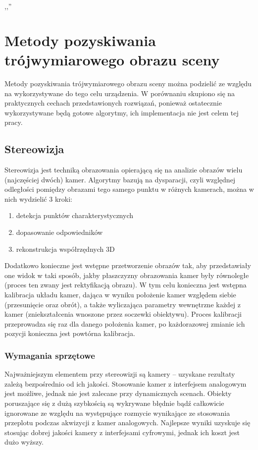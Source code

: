 

\begin{savequote}[70mm]
,,''
\qauthor{}
\end{savequote}

\chapter{Metody pozyskiwania trójwymiarowego obrazu sceny}
\label{chap:porownanie}

Metody pozyskiwania trójwymiarowego obrazu sceny można podzielić ze względu
na wykorzystywane do tego celu urządzenia. W porównaniu skupiono się na praktycznych
cechach przedstawionych rozwiązań, ponieważ ostatecznie wykorzystywane będą gotowe
algorytmy, ich implementacja nie jest celem tej pracy.


\section{Stereowizja}

Stereowizja jest techniką obrazowania opierającą się na analizie obrazów wielu
(najczęściej dwóch) kamer. Algorytmy bazują na dysparacji, czyli względnej odległości pomiędzy
obrazami tego samego punktu w różnych kamerach, można w nich wydzielić 3 kroki:

\begin{enumerate}
\item detekcja punktów charakterystycznych
\item dopasowanie odpowiedników
\item rekonstrukcja współrzędnych 3D
\end{enumerate}

Dodatkowo konieczne jest wstępne przetworzenie obrazów tak, aby przedstawiały
one widok w taki sposób, jakby płaszczyzny obrazowania kamer były równoległe
(proces ten zwany jest rektyfikacją obrazu). W tym celu konieczna jest wstępna
kalibracja układu kamer, dająca w wyniku położenie kamer względem siebie (przesunięcie
oraz obrót), a także wyliczająca parametry wewnętrzne każdej z kamer (zniekształcenia
wnoszone przez soczewki obiektywu). Proces kalibracji przeprowadza się raz dla danego
położenia kamer, po każdorazowej zmianie ich pozycji konieczna jest powtórna kalibracja.

\subsection{Wymagania sprzętowe}
Najważniejszym elementem przy stereowizji są kamery -- uzyskane rezultaty zależą
bezpośrednio od ich jakości. Stosowanie kamer z interfejsem analogowym jest możliwe, jednak nie
jest zalecane przy dynamicznych scenach. Obiekty poruszające się z dużą szybkością
są wykrywane błędnie bądź całkowicie ignorowane ze względu na występujące rozmycie
wynikające ze stosowania przeplotu podczas akwizycji z kamer analogowych. Najlepsze wyniki
uzyskuje się stosując dobrej jakości kamery z interfejsami cyfrowymi, jednak ich
koszt jest dużo wyższy.

